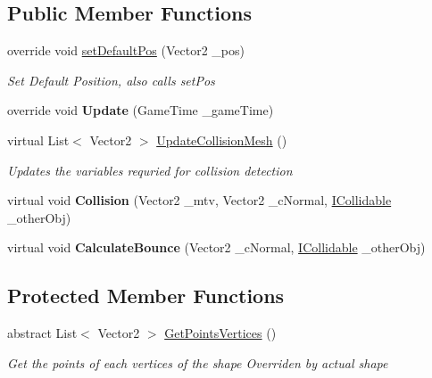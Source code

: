 \subsection*{Public Member Functions}
\begin{DoxyCompactItemize}
\item 
override void \mbox{\hyperlink{class_g_m_t_b_1_1_collision_system_1_1_convex_shape_ab31e50bc6e7ae58970eb512355608184}{set\+Default\+Pos}} (Vector2 \+\_\+pos)
\begin{DoxyCompactList}\small\item\em Set Default Position, also calls set\+Pos \end{DoxyCompactList}\item 
\mbox{\label{class_g_m_t_b_1_1_collision_system_1_1_convex_shape_a2bbcdf1ce494833270e0cd42a37454f7}} 
override void {\bfseries Update} (Game\+Time \+\_\+game\+Time)
\item 
virtual List$<$ Vector2 $>$ \mbox{\hyperlink{class_g_m_t_b_1_1_collision_system_1_1_convex_shape_a76feae341b6ea65672ffac2f897fdd00}{Update\+Collision\+Mesh}} ()
\begin{DoxyCompactList}\small\item\em Updates the variables requried for collision detection \end{DoxyCompactList}\item 
\mbox{\label{class_g_m_t_b_1_1_collision_system_1_1_convex_shape_a396821cf70328272128eedfe9b9a124f}} 
virtual void {\bfseries Collision} (Vector2 \+\_\+mtv, Vector2 \+\_\+c\+Normal, \mbox{\hyperlink{interface_g_m_t_b_1_1_collision_system_1_1_i_collidable}{I\+Collidable}} \+\_\+other\+Obj)
\item 
\mbox{\label{class_g_m_t_b_1_1_collision_system_1_1_convex_shape_a5139527f0e14bfcaf74619775b3cbb48}} 
virtual void {\bfseries Calculate\+Bounce} (Vector2 \+\_\+c\+Normal, \mbox{\hyperlink{interface_g_m_t_b_1_1_collision_system_1_1_i_collidable}{I\+Collidable}} \+\_\+other\+Obj)
\end{DoxyCompactItemize}
\subsection*{Protected Member Functions}
\begin{DoxyCompactItemize}
\item 
abstract List$<$ Vector2 $>$ \mbox{\hyperlink{class_g_m_t_b_1_1_collision_system_1_1_convex_shape_a7748beb90c69edb0403c1c46ff99ac05}{Get\+Points\+Vertices}} ()
\begin{DoxyCompactList}\small\item\em Get the points of each vertices of the shape Overriden by actual shape \end{DoxyCompactList}\end{DoxyCompactItemize}
